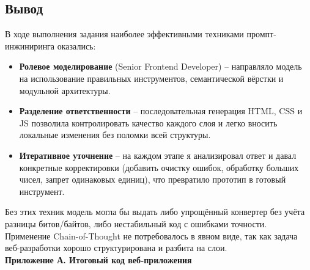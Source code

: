 \subsection{Вывод}
В ходе выполнения задания наиболее эффективными техниками промпт-инжиниринга оказались:
\begin{itemize}
\item \textbf{Ролевое моделирование} (Senior Frontend Developer) – направляло модель на использование правильных инструментов, семантической вёрстки и модульной архитектуры.
\item \textbf{Разделение ответственности} – последовательная генерация HTML, CSS и JS позволила контролировать качество каждого слоя и легко вносить локальные изменения без поломки всей структуры.
\item \textbf{Итеративное уточнение} – на каждом этапе я анализировал ответ и давал конкретные корректировки (добавить очистку ошибок, обработку больших чисел, запрет одинаковых единиц), что превратило прототип в готовый инструмент.
\end{itemize}
Без этих техник модель могла бы выдать либо упрощённый конвертер без учёта разницы битов/байтов, либо нестабильный код с ошибками точности.
Применение Chain-of-Thought не потребовалось в явном виде, так как задача веб-разработки хорошо структурирована и разбита на слои.\\

\textbf{Приложение А. Итоговый код веб-приложения} \\
